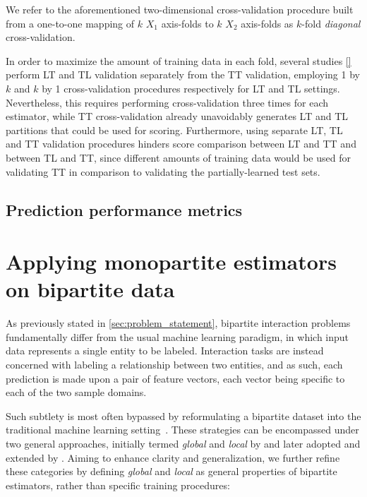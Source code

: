 We refer to the aforementioned two-dimensional cross-validation procedure built from a one-to-one mapping of $k$ $X_1$ axis-folds to $k$ $X_2$ axis-folds as $k$-fold \emph{diagonal} cross-validation.


In order to maximize the amount of training data in each fold, several studies \ref{} perform LT and TL validation separately from the TT validation, employing 1 by $k$ and $k$ by 1 cross-validation procedures respectively for LT and TL settings. Nevertheless, this requires performing cross-validation three times for each estimator, while TT cross-validation already unavoidably generates LT and TL partitions that could be used for scoring. Furthermore, using separate LT, TL and TT validation procedures hinders score comparison between LT and TT and between TL and TT, since different amounts of training data would be used for validating TT in comparison to validating the partially-learned test sets.


\subsection{Prediction performance metrics}  %
\label{sec:prediction_metrics}


\section{Applying monopartite estimators on bipartite data}
\label{sec:common_approaches}

As previously stated in \autoref{sec:problem_statement}, bipartite interaction problems fundamentally differ from the usual machine learning paradigm, in which input data represents a single entity to be labeled. Interaction tasks are instead concerned with labeling a relationship between two entities, and as such, each prediction is made upon a pair of feature vectors, each vector being specific to each of the two sample domains.

Such subtlety is most often bypassed by reformulating a bipartite dataset into the traditional machine learning setting~\cite{vert2008reconstruction}.
%
These strategies can be encompassed under two general approaches, initially termed \emph{global} and \emph{local} by \citet{vert2008reconstruction} and later adopted and extended by \citet{sschrynemackers2015}.  %
Aiming to enhance clarity and generalization, we further refine these categories by defining \emph{global} and \emph{local} as general properties of bipartite estimators, rather than specific training procedures:

